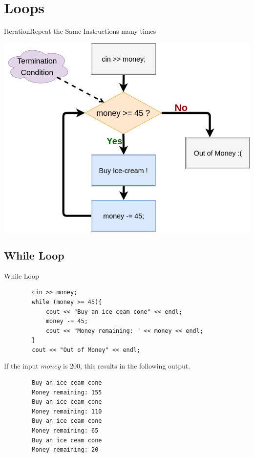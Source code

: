 \section{Loops}

\begin{frame}[fragile]{Iteration}{Repeat the Same Instructions many times}
    \begin{center}
        \includegraphics[width=0.75\linewidth]{images/while_flow.png}
    \end{center}
\end{frame}

\subsection{While Loop}
\begin{frame}[fragile]{While Loop}{}
    \begin{verbatim}
        cin >> money;
        while (money >= 45){
            cout << "Buy an ice ceam cone" << endl;
            money -= 45;
            cout << "Money remaining: " << money << endl;
        }
        cout << "Out of Money" << endl;
    \end{verbatim}
    \begin{block}{If the input $money$ is 200, this results in the following output.}
        \begin{verbatim}
        Buy an ice ceam cone
        Money remaining: 155
        Buy an ice ceam cone
        Money remaining: 110
        Buy an ice ceam cone
        Money remaining: 65 
        Buy an ice ceam cone
        Money remaining: 20 
        \end{verbatim}
    \end{block}
\end{frame}

